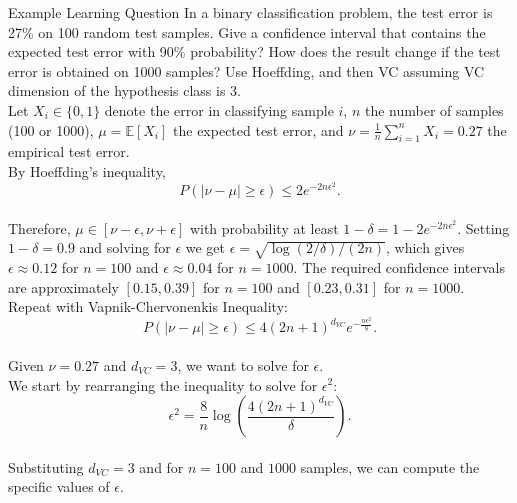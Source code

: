 \begin{examplebox}{Example Learning Question}
    In a binary classification problem, the test error is 27\% on 100 random test samples. Give a confidence interval that contains the expected test error with 90\% probability? How does the result change if the test error is obtained on 1000 samples? Use Hoeffding, and then VC assuming VC dimension of the hypothesis class is 3.\\

Let $X_i \in \{0,1\}$ denote the error in classifying sample $i$, $n$ the number of samples (100 or 1000), $\mu = \mathbb{E}[X_i]$ the expected test error, and $\nu = \frac{1}{n}\sum_{i=1}^{n} X_i = 0.27$ the empirical test error.\\

By Hoeffding's inequality,
\[ P(|\nu - \mu| \geq \epsilon) \leq 2e^{-2n\epsilon^2}. \]\\

Therefore, $\mu \in [\nu - \epsilon, \nu + \epsilon]$ with probability at least $1 - \delta = 1 - 2e^{-2n\epsilon^2}$. Setting $1 - \delta = 0.9$ and solving for $\epsilon$ we get $\epsilon = \sqrt{\log(2/\delta)/(2n)}$, which gives $\epsilon \approx 0.12$ for $n = 100$ and $\epsilon \approx 0.04$ for $n = 1000$. The required confidence intervals are approximately $[0.15, 0.39]$ for $n = 100$ and $[0.23, 0.31]$ for $n = 1000$.\\

Repeat with Vapnik-Chervonenkis Inequality:
\[ P(|\nu - \mu| \geq \epsilon) \leq 4(2n + 1)^{d_{VC}}e^{-\frac{n\epsilon^2}{8}}. \]\\

Given $\nu = 0.27$ and $d_{VC} = 3$, we want to solve for $\epsilon$.\\

We start by rearranging the inequality to solve for $\epsilon^2$:
\[ \epsilon^2 = \frac{8}{n} \log\left(\frac{4(2n + 1)^{d_{VC}}}{\delta}\right). \]\\

Substituting $d_{VC} = 3$ and for $n = 100$ and $1000$ samples, we can compute the specific values of $\epsilon$. 

\end{examplebox}

